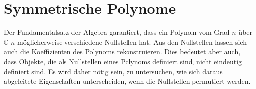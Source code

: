 %
%
%
\section{Symmetrische Polynome}
%
Der Fundamentalsatz der Algebra garantiert, dass ein Polynom vom Grad
$n$ über $\mathbb{C}$ $n$ möglicherweise verschiedene Nullstellen hat.
Aus den Nullstellen lassen sich auch die Koeffizienten des Polynoms
rekonstruieren.
Dies bedeutet aber auch, dass Objekte, die als Nullstellen eines Polynoms
definiert sind, nicht eindeutig definiert sind.
Es wird daher nötig sein, zu untersuchen, wie sich daraus abgeleitete
Eigenschaften unterscheiden, wenn die Nullstellen permutiert werden.



